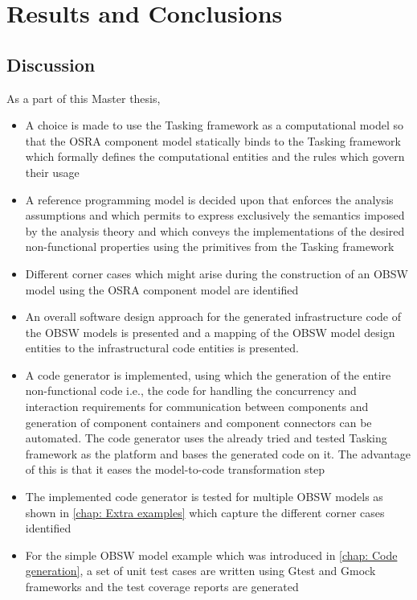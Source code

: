 
\chapter{Results and Conclusions}
\label{chap:conclusion}

\section{Discussion}
As a part of this Master thesis, 
\begin{itemize}
\item A choice is made to use the Tasking framework as a computational model so that the OSRA component model statically binds to the Tasking framework which formally defines the computational entities and the rules which govern their usage 
\item A reference programming model is decided upon that enforces the analysis assumptions and which permits to express exclusively the semantics imposed by the analysis theory and which conveys the implementations of the desired non-functional properties using the primitives from the Tasking framework
\item Different corner cases which might arise during the construction of an OBSW model using the OSRA component model are identified 
\item An overall software design approach for the generated infrastructure code of the OBSW models is presented and a mapping of the OBSW model design entities to the infrastructural code entities is presented.  
\item A code generator is implemented, using which the generation of the entire non-functional code i.e., the code for handling the concurrency and interaction requirements for communication between components and generation of component containers and component connectors can be automated. The code generator uses the already tried and tested Tasking framework as the platform and bases the generated code on it. The advantage of this is that it eases the model-to-code transformation step 
\item The implemented code generator is tested for multiple OBSW models as shown in \cref{chap: Extra examples} which capture the different corner cases identified
\item For the simple OBSW model example which was introduced in \cref{chap: Code generation}, a set of unit test cases are written using Gtest and Gmock frameworks and the test coverage reports are generated
\end{itemize}

